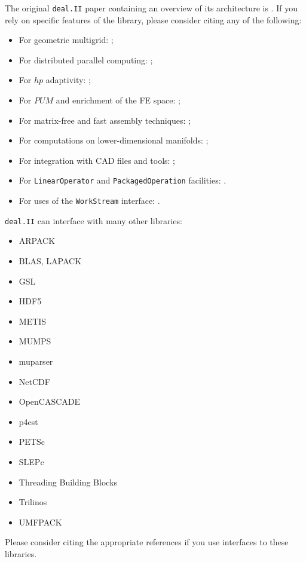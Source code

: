 \documentclass{ansarticle-preprint}
\newcommand{\specialword}[1]{\texttt{#1}}
\newcommand{\dealii}{{\specialword{deal.II}}}
\begin{document}
The original \texttt{\dealii{}} paper containing an overview of its
architecture is \cite{BangerthHartmannKanschat2007}. If you rely on specific
features of the library, please consider citing any of the following:
\begin{itemize}
 \item For geometric multigrid: \cite{Kanschat2004,JanssenKanschat2011};
 \item For distributed parallel computing: \cite{BangerthBursteddeHeisterKronbichler11};
 \item For $hp$ adaptivity: \cite{BangerthKayserHerold2007};
  \item For $PUM$ and enrichment of the FE space: \cite{Davydov2016};
 \item For matrix-free and fast assembly techniques:
   \cite{KronbichlerKormann2012};
 \item For computations on lower-dimensional manifolds:
   \cite{DeSimoneHeltaiManigrasso2009};
 \item For integration with CAD files and tools:
   \cite{HeltaiMola2015};
 \item For \texttt{LinearOperator} and \texttt{PackagedOperation} facilities:
   \cite{MaierBardelloniHeltai-2016-a,MaierBardelloniHeltai-2016-b}.
 \item For uses of the \texttt{WorkStream} interface:
   \cite{TKB16}.
\end{itemize}

\dealii{} can interface with many other libraries:
\begin{multicols}{2}
\begin{itemize}
\item ARPACK \cite{arpack}
\item BLAS, LAPACK
\item GSL \cite{gsl2016}
\item HDF5 \cite{hdf5}
\item METIS \cite{karypis1998fast}
\item MUMPS \cite{ADE00,MUMPS:1,MUMPS:2,mumps-web-page}
\item muparser \cite{muparser-web-page}
\item NetCDF \cite{rew1990netcdf}
\item OpenCASCADE \cite{opencascade-web-page}
\item p4est \cite{p4est}
\item PETSc \cite{petsc-user-ref,petsc-web-page}
\item SLEPc \cite{Hernandez:2005:SSF}
\item Threading Building Blocks \cite{Rei07}
\item Trilinos \cite{trilinos,trilinos-web-page}
\item UMFPACK \cite{umfpack}
\end{itemize}
\end{multicols}
Please consider citing the appropriate references if you use interfaces to these
libraries.
\end{document}
